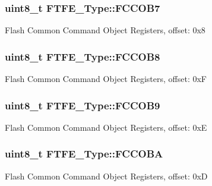 \subsubsection[{\texorpdfstring{F\+C\+C\+O\+B7}{FCCOB7}}]{ uint8\+\_\+t F\+T\+F\+E\+\_\+\+Type\+::\+F\+C\+C\+O\+B7}\hypertarget{structFTFE__Type_a9b10b2371aad9262d5bdb672cd56e59b}{}\label{structFTFE__Type_a9b10b2371aad9262d5bdb672cd56e59b}
Flash Common Command Object Registers, offset\+: 0x8 
\subsubsection[{\texorpdfstring{F\+C\+C\+O\+B8}{FCCOB8}}]{ uint8\+\_\+t F\+T\+F\+E\+\_\+\+Type\+::\+F\+C\+C\+O\+B8}\hypertarget{structFTFE__Type_a961fcaf78cf4460a359884d13b095d79}{}\label{structFTFE__Type_a961fcaf78cf4460a359884d13b095d79}
Flash Common Command Object Registers, offset\+: 0xF 
\subsubsection[{\texorpdfstring{F\+C\+C\+O\+B9}{FCCOB9}}]{ uint8\+\_\+t F\+T\+F\+E\+\_\+\+Type\+::\+F\+C\+C\+O\+B9}\hypertarget{structFTFE__Type_a4338ec475d6722b7bfcaf090ce50fe78}{}\label{structFTFE__Type_a4338ec475d6722b7bfcaf090ce50fe78}
Flash Common Command Object Registers, offset\+: 0xE 
\subsubsection[{\texorpdfstring{F\+C\+C\+O\+BA}{FCCOBA}}]{ uint8\+\_\+t F\+T\+F\+E\+\_\+\+Type\+::\+F\+C\+C\+O\+BA}\hypertarget{structFTFE__Type_acc577b45d7a56b97e7b984e4e6a03389}{}\label{structFTFE__Type_acc577b45d7a56b97e7b984e4e6a03389}
Flash Common Command Object Registers, offset\+: 0xD 
